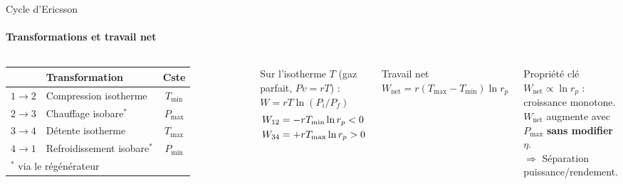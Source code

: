 \documentclass[aspectratio=43, 10pt]{beamer}
\newcommand{\resultbox}[2][R\'esultat cl\'e]{%
  \begin{alertblock}{#1}\centering$\displaystyle #2$\end{alertblock}}
\newcommand{\Tmin}{T_{\min}}
\newcommand{\Tmax}{T_{\max}}
\newcommand{\Pmin}{P_{\min}}
\newcommand{\Pmax}{P_{\max}}
\newcommand{\rp}{r_p}
\newcommand{\Wnet}{W_{\text{net}}}
\begin{document}
\begin{frame}{Cycle d'Ericsson }
  \framesubtitle{Transformations et travail net}

  \begin{columns}[T,onlytextwidth]
      \scriptsize
      \begin{tabular}{clc}
        \toprule
        & Transformation & Cste \\
        \midrule
        $1\!\to\!2$ & Compression isotherme      & $\Tmin$ \\
        $2\!\to\!3$ & Chauffage isobare$^*$ & $\Pmax$ \\
        $3\!\to\!4$ & D\'etente isotherme        & $\Tmax$ \\
        $4\!\to\!1$ & Refroidissement isobare$^*$ & $\Pmin$ \\
        \bottomrule
        \multicolumn{3}{l}{\tiny $^*$ via le r\'eg\'en\'erateur}
      \end{tabular}

      \vspace{0.5em}
      \scriptsize Sur l'isotherme $T$ (gaz parfait, $Pv=rT$) :
      $W = rT\ln(P_i/P_f)$
      \begin{align*}\scriptsize
        W_{12} &= -r\Tmin\ln\rp < 0 \\
        W_{34} &= +r\Tmax\ln\rp > 0
      \end{align*}

      \resultbox[Travail net]{%
        \Wnet = r(\Tmax-\Tmin)\ln\rp}

      \begin{exampleblock}{Propri\'et\'e cl\'e}
        \small
        $\Wnet \propto \ln\rp$ : croissance monotone.\\[2pt]
        $\Wnet$ augmente avec $\Pmax$
        \textbf{sans modifier $\eta$}.\\[2pt]
        $\Rightarrow$ S\'eparation puissance/rendement.
      \end{exampleblock}


\end{columns}
\end{frame}
\end{document}
